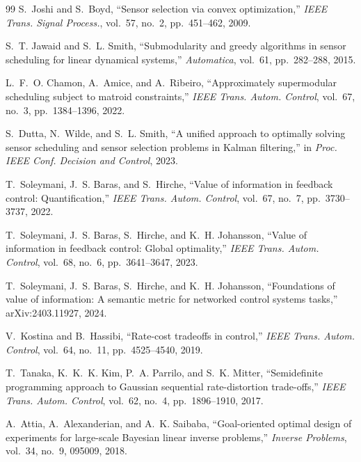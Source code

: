 \documentclass{article}
\theoremstyle{definition}
\theoremstyle{remark}
\begin{document}
\begin{thebibliography}{99}
 S.~Joshi and S.~Boyd, ``Sensor selection via convex
optimization,'' \emph{IEEE Trans. Signal Process.}, vol.~57, no.~2,
pp.~451--462, 2009.

 S.~T. Jawaid and S.~L. Smith, ``Submodularity and
greedy algorithms in sensor scheduling for linear dynamical systems,''
\emph{Automatica}, vol.~61, pp.~282--288, 2015.

 L.~F.~O. Chamon, A.~Amice, and A.~Ribeiro,
``Approximately supermodular scheduling subject to matroid constraints,''
\emph{IEEE Trans. Autom. Control}, vol.~67, no.~3, pp.~1384--1396, 2022.

 S.~Dutta, N.~Wilde, and S.~L. Smith, ``A unified
approach to optimally solving sensor scheduling and sensor selection
problems in Kalman filtering,'' in \emph{Proc. IEEE Conf. Decision and
Control}, 2023.

 T.~Soleymani, J.~S. Baras, and S.~Hirche, ``Value of
information in feedback control: Quantification,'' \emph{IEEE Trans. Autom.
Control}, vol.~67, no.~7, pp.~3730--3737, 2022.

 T.~Soleymani, J.~S. Baras, S.~Hirche, and K.~H.
Johansson, ``Value of information in feedback control: Global optimality,''
\emph{IEEE Trans. Autom. Control}, vol.~68, no.~6, pp.~3641--3647, 2023.

 T.~Soleymani, J.~S. Baras, S.~Hirche, and K.~H.
Johansson, ``Foundations of value of information: A semantic metric for
networked control systems tasks,'' arXiv:2403.11927, 2024.

 V.~Kostina and B.~Hassibi, ``Rate-cost tradeoffs in
control,'' \emph{IEEE Trans. Autom. Control}, vol.~64, no.~11,
pp.~4525--4540, 2019.

 T.~Tanaka, K.~K.~K. Kim, P.~A. Parrilo, and S.~K.
Mitter, ``Semidefinite programming approach to Gaussian sequential
rate-distortion trade-offs,'' \emph{IEEE Trans. Autom. Control}, vol.~62,
no.~4, pp.~1896--1910, 2017.

 A.~Attia, A.~Alexanderian, and A.~K. Saibaba,
``Goal-oriented optimal design of experiments for large-scale Bayesian linear
inverse problems,'' \emph{Inverse Problems}, vol.~34, no.~9, 095009, 2018.


\end{thebibliography}
\end{document}
